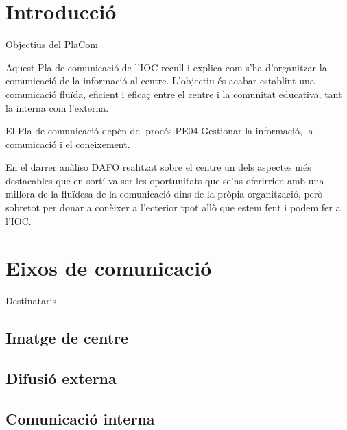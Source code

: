 \documentclass[fontsize=10pt,%
 4paper=a4,%
 4%
 4%
 4DIV=14,%
 4twoside,%
 4pagesize=auto,%
 4%
 4parskip=half,
 4%
 4captions=tableheading,%
 4numbers=noenddot,%
 4toc=graduated%
 4%
]{scrartcl}
\begin{document}



\thispagestyle{empty}
\setcounter{tocdepth}{4}
\tableofcontents

\clearpage

\pagestyle{scrheadings}


\section{Introducció}\label{sec:intro}

Objectius del PlaCom

Aquest Pla de comunicació de l'IOC recull i explica com s'ha d'organitzar la comunicació de la informació al centre. L'objectiu és acabar establint una comunicació fluïda, eficient i eficaç entre el centre i la comunitat educativa, tant la interna com l'externa.

El Pla de comunicació depèn del procés PE04 Gestionar la informació, la comunicació i el coneixement.

En el darrer anàliso DAFO realitzat sobre el centre un dels aspectes més destacables que en sortí va ser les oportunitats que se'ns oferirrien amb una millora de la fluïdesa de la comunicació dins de la pròpia organització, però sobretot per donar a conèixer a l'ecterior tpot allò que estem fent i podem fer a l'IOC.

\section{Eixos de comunicació}\label{sec:eixos}

Destinataris

\subsection{Imatge de centre}

\subsection{Difusió externa}

\subsection{Comunicació interna}
\end{document}
